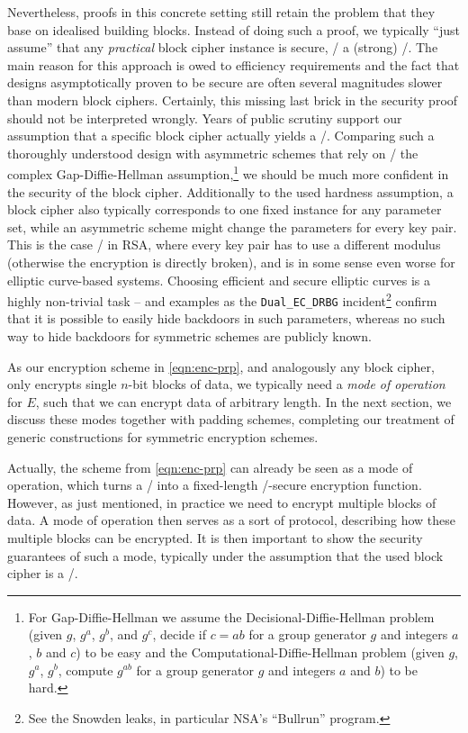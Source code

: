 Nevertheless, proofs in this concrete setting still retain the problem that they base on idealised building blocks.
Instead of doing such a proof, we typically \enquote{just assume} that any \emph{practical} block cipher instance is secure, \ie/ a (strong) \PRP/.
The main reason for this approach is owed to efficiency requirements and the fact that designs asymptotically proven to be secure are often several magnitudes slower than modern block ciphers.
Certainly, this missing last brick in the security proof should not be interpreted wrongly.
Years of public scrutiny support our assumption that a specific block cipher actually yields a \PRP/.
Comparing such a thoroughly understood design with asymmetric schemes that rely on \eg/ the complex Gap-Diffie-Hellman assumption,\footnote{%
    For Gap-Diffie-Hellman we assume the Decisional-Diffie-Hellman problem (given $g$, $g^a$, $g^b$, and $g^c$, decide if $c=ab$ for a group generator $g$ and integers $a$, $b$ and $c$) to be easy and the Computational-Diffie-Hellman problem (given $g$, $g^a$, $g^b$, compute $g^{ab}$ for a group generator $g$ and integers $a$ and $b$) to be hard.
}
we should be much more confident in the security of the block cipher.
Additionally to the used hardness assumption, a block cipher also typically corresponds to one fixed instance for any parameter set, while an asymmetric scheme might change the parameters for every key pair.
This is the case \eg/ in RSA, where every key pair has to use a different modulus (otherwise the encryption is directly broken), and is in some sense even worse for elliptic curve-based systems.
Choosing efficient and secure elliptic curves is a highly non-trivial task -- and examples as the \texttt{Dual\_EC\_DRBG} incident\footnote{%
    See the Snowden leaks, in particular NSA's \enquote{Bullrun} program.
} confirm that it is possible to easily hide backdoors in such parameters, whereas no such way to hide backdoors for symmetric schemes are publicly known.

As our encryption scheme in \cref{eqn:enc-prp}, and analogously any block cipher, only encrypts single $n$-bit blocks of data, we typically need a \emph{mode of operation} for $E$, such that we can encrypt data of arbitrary length.
In the next section, we discuss these modes together with padding schemes, completing our treatment of generic constructions for symmetric encryption schemes.

Actually, the scheme from \cref{eqn:enc-prp} can already be seen as a mode of operation, which turns a \PRP/ into a fixed-length \CPA/-secure encryption function.
However, as just mentioned, in practice we need to encrypt multiple blocks of data.
A mode of operation then serves as a sort of protocol, describing how these multiple blocks can be encrypted.
It is then important to show the security guarantees of such a mode, typically under the assumption that the used block cipher is a \PRP/.

